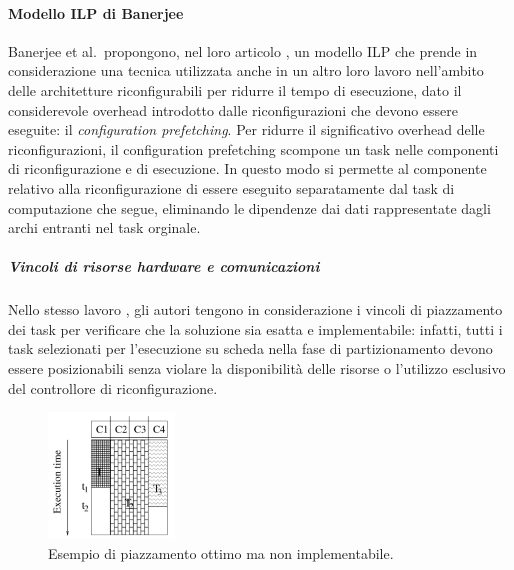 \paragraph{Modello \acs{ILP} di Banerjee}
\label{par:BanerjeeILP}
Banerjee et al.~propongono, nel loro 
articolo \cite{BanerjeePhysicalConstraints}, un modello \ac{ILP} che prende in
considerazione una tecnica utilizzata anche in un altro loro lavoro 
\cite{BanerjeeReconfigurationOverhead} nell'ambito delle architetture 
riconfigurabili per ridurre il tempo di esecuzione, dato il considerevole 
overhead introdotto dalle riconfigurazioni che devono essere eseguite: il 
\emph{configuration prefetching}. Per ridurre il significativo overhead delle 
riconfigurazioni, il configuration prefetching scompone un task nelle componenti 
di riconfigurazione e di esecuzione. In questo modo si permette al componente 
relativo alla riconfigurazione di essere eseguito separatamente dal task di 
computazione che segue, eliminando le dipendenze dai dati rappresentate dagli 
archi entranti nel task orginale.

\subparagraph{Vincoli di risorse hardware e comunicazioni}
Nello stesso lavoro \cite{BanerjeePhysicalConstraints}, gli autori tengono 
in considerazione i vincoli di piazzamento dei task per verificare che la 
soluzione sia esatta e implementabile: infatti, tutti i task selezionati per 
l'esecuzione su scheda nella fase di partizionamento devono essere 
posizionabili senza violare la disponibilità delle risorse o l'utilizzo esclusivo del 
controllore di riconfigurazione.

\begin{figure}[!hb]
 \begin{center}
  \includegraphics[width=0.3\textwidth]
{./capitoli/figure/cap2/InfeasiblePlacement.pdf}
\caption[Piazzamento ottimo non implementabile]{Esempio di piazzamento ottimo 
ma non implementabile.\footnotemark}
\label{fig:infeasiblePlacement}
 \end{center}
\end{figure}


